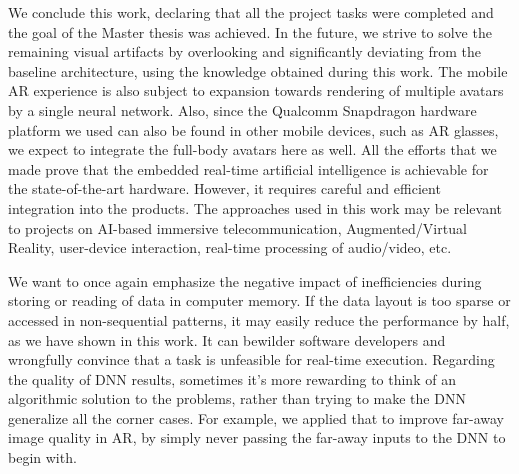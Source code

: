 We conclude this work, declaring that all the project tasks were completed and the goal of the Master thesis was achieved. In the future, we strive to solve the remaining visual artifacts by overlooking and significantly deviating from the baseline architecture, using the knowledge obtained during this work. The mobile AR experience is also subject to expansion towards rendering of multiple avatars by a single neural network. Also, since the Qualcomm Snapdragon hardware platform we used can also be found in other mobile devices, such as AR glasses, we expect to integrate the full-body avatars here as well. All the efforts that we made prove that the embedded real-time artificial intelligence is achievable for the state-of-the-art hardware. However, it requires careful and efficient integration into the products. The approaches used in this work may be relevant to projects on AI-based immersive telecommunication, Augmented/Virtual Reality, user-device interaction, real-time processing of audio/video, etc. 

We want to once again emphasize the negative impact of inefficiencies during storing or reading of data in computer memory. If the data layout is too sparse or accessed in non-sequential patterns, it may easily reduce the performance by half, as we have shown in this work. It can bewilder software developers and wrongfully convince that a task is unfeasible for real-time execution.  Regarding the quality of DNN results, sometimes it's more rewarding to think of an algorithmic solution to the problems, rather than trying to make the DNN generalize all the corner cases. For example, we applied that to improve far-away image quality in AR, by simply never passing the far-away inputs to the DNN to begin with.

